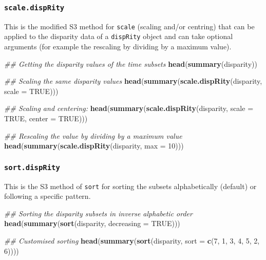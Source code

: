 \documentclass[
]{book}
\newenvironment{Shaded}{\begin{snugshade}}{\end{snugshade}}
\newcommand{\CommentTok}[1]{\textcolor[rgb]{0.56,0.35,0.01}{\textit{#1}}}
\newcommand{\DataTypeTok}[1]{\textcolor[rgb]{0.13,0.29,0.53}{#1}}
\newcommand{\DecValTok}[1]{\textcolor[rgb]{0.00,0.00,0.81}{#1}}
\newcommand{\KeywordTok}[1]{\textcolor[rgb]{0.13,0.29,0.53}{\textbf{#1}}}
\newcommand{\NormalTok}[1]{#1}
\newcommand{\OtherTok}[1]{\textcolor[rgb]{0.56,0.35,0.01}{#1}}
\begin{document}
\hypertarget{scale.disprity}{%
\subsubsection{\texorpdfstring{\texttt{scale.dispRity}}{scale.dispRity}}\label{scale.disprity}}

This is the modified S3 method for \texttt{scale} (scaling and/or centring) that can be applied to the disparity data of a \texttt{dispRity} object and can take optional arguments (for example the rescaling by dividing by a maximum value).

\begin{Shaded}
\begin{Highlighting}[]
\CommentTok{\#\# Getting the disparity values of the time subsets}
\KeywordTok{head}\NormalTok{(}\KeywordTok{summary}\NormalTok{(disparity))}

\CommentTok{\#\# Scaling the same disparity values}
\KeywordTok{head}\NormalTok{(}\KeywordTok{summary}\NormalTok{(}\KeywordTok{scale.dispRity}\NormalTok{(disparity, }\DataTypeTok{scale =} \OtherTok{TRUE}\NormalTok{)))}

\CommentTok{\#\# Scaling and centering:}
\KeywordTok{head}\NormalTok{(}\KeywordTok{summary}\NormalTok{(}\KeywordTok{scale.dispRity}\NormalTok{(disparity, }\DataTypeTok{scale =} \OtherTok{TRUE}\NormalTok{, }\DataTypeTok{center =} \OtherTok{TRUE}\NormalTok{)))}

\CommentTok{\#\# Rescaling the value by dividing by a maximum value}
\KeywordTok{head}\NormalTok{(}\KeywordTok{summary}\NormalTok{(}\KeywordTok{scale.dispRity}\NormalTok{(disparity, }\DataTypeTok{max =} \DecValTok{10}\NormalTok{)))}
\end{Highlighting}
\end{Shaded}

\hypertarget{sort.disprity}{%
\subsubsection{\texorpdfstring{\texttt{sort.dispRity}}{sort.dispRity}}\label{sort.disprity}}

This is the S3 method of \texttt{sort} for sorting the subsets alphabetically (default) or following a specific pattern.

\begin{Shaded}
\begin{Highlighting}[]
\CommentTok{\#\# Sorting the disparity subsets in inverse alphabetic order}
\KeywordTok{head}\NormalTok{(}\KeywordTok{summary}\NormalTok{(}\KeywordTok{sort}\NormalTok{(disparity, }\DataTypeTok{decreasing =} \OtherTok{TRUE}\NormalTok{)))}

\CommentTok{\#\# Customised sorting}
\KeywordTok{head}\NormalTok{(}\KeywordTok{summary}\NormalTok{(}\KeywordTok{sort}\NormalTok{(disparity, }\DataTypeTok{sort =} \KeywordTok{c}\NormalTok{(}\DecValTok{7}\NormalTok{, }\DecValTok{1}\NormalTok{, }\DecValTok{3}\NormalTok{, }\DecValTok{4}\NormalTok{, }\DecValTok{5}\NormalTok{, }\DecValTok{2}\NormalTok{, }\DecValTok{6}\NormalTok{))))}
\end{Highlighting}
\end{Shaded}
\end{document}
